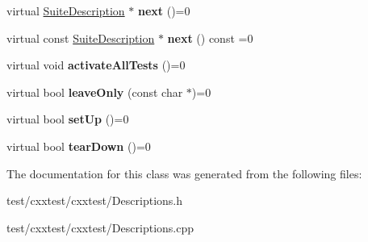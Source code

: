 \begin{DoxyCompactItemize}
\item 
\hypertarget{classCxxTest_1_1SuiteDescription_a6658622330bc0138eaf70612228134c0}{virtual \hyperlink{classCxxTest_1_1SuiteDescription}{Suite\-Description} $\ast$ {\bfseries next} ()=0}\label{classCxxTest_1_1SuiteDescription_a6658622330bc0138eaf70612228134c0}

\item 
\hypertarget{classCxxTest_1_1SuiteDescription_ab4d55e627663e89367bf094324a5ee44}{virtual const \hyperlink{classCxxTest_1_1SuiteDescription}{Suite\-Description} $\ast$ {\bfseries next} () const =0}\label{classCxxTest_1_1SuiteDescription_ab4d55e627663e89367bf094324a5ee44}

\item 
\hypertarget{classCxxTest_1_1SuiteDescription_a68393280006331f5af2c9d1eabf9e5ea}{virtual void {\bfseries activate\-All\-Tests} ()=0}\label{classCxxTest_1_1SuiteDescription_a68393280006331f5af2c9d1eabf9e5ea}

\item 
\hypertarget{classCxxTest_1_1SuiteDescription_a89c187264ad03efd1d9a635fbc5948c5}{virtual bool {\bfseries leave\-Only} (const char $\ast$)=0}\label{classCxxTest_1_1SuiteDescription_a89c187264ad03efd1d9a635fbc5948c5}

\item 
\hypertarget{classCxxTest_1_1SuiteDescription_acbd2e013cd84268772cdd413013a6761}{virtual bool {\bfseries set\-Up} ()=0}\label{classCxxTest_1_1SuiteDescription_acbd2e013cd84268772cdd413013a6761}

\item 
\hypertarget{classCxxTest_1_1SuiteDescription_a4a60e237014ee66c9d7d792eb15916fa}{virtual bool {\bfseries tear\-Down} ()=0}\label{classCxxTest_1_1SuiteDescription_a4a60e237014ee66c9d7d792eb15916fa}

\end{DoxyCompactItemize}


The documentation for this class was generated from the following files\-:\begin{DoxyCompactItemize}
\item 
test/cxxtest/cxxtest/Descriptions.\-h\item 
test/cxxtest/cxxtest/Descriptions.\-cpp\end{DoxyCompactItemize}
